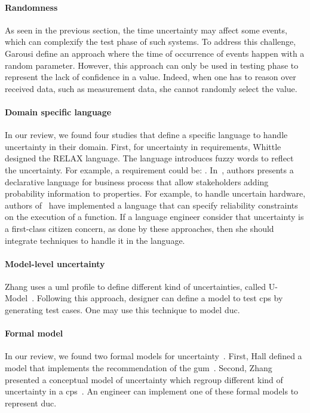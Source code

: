 \paragraph{Randomness}
As seen in the previous section, the time uncertainty may affect some events, which can complexify the test phase of such systems.
To address this challenge, Garousi \etal \cite{DBLP:conf/icst/Garousi08} define an approach where the time of occurrence of events happen with a random parameter.
However, this approach can only be used in testing phase to represent the lack of confidence in a value.
Indeed, when one has to reason over received data, such as measurement data, she cannot randomly select the value.
	
\paragraph{Domain specific language}
In our review, we found four studies that define a specific language to handle uncertainty in their domain.
First, for uncertainty in requirements, Whittle \etal \cite{DBLP:journals/re/WhittleSBCB10, DBLP:conf/re/WhittleSBCB09} designed the RELAX language.
The language introduces fuzzy words to reflect the uncertainty.
For example, a requirement could be: .
In~\cite{DBLP:journals/infsof/Jimenez-RamirezW0V15}, authors presents a declarative language for business process that allow stakeholders adding probability information to properties.
For example, to handle uncertain hardware, authors of~\cite{DBLP:conf/oopsla/CarbinMR13} have implemented a language that can specify reliability constraints on the execution of a function.
If a language engineer consider that uncertainty is a first-class citizen concern, as done by these approaches, then she should integrate techniques to handle it in the language.
	
\paragraph{Model-level uncertainty}
Zhang \etal \cite{DBLP:journals/sosym/Zhang00NO19} uses a \gls{uml} profile to define different kind of uncertainties, called U-Model~\cite{DBLP:conf/ecmdafa/ZhangSAYON16}.
Following this approach, designer can define a model to test \gls{cps} by generating test cases.
One may use this technique to model \gls{duc}.
	
\paragraph{Formal model}
In our review, we found two formal models for uncertainty~\cite{DBLP:journals/csi/Hall06, DBLP:conf/ecmdafa/ZhangSAYON16}.
First, Hall \etal defined a model that implements the recommendation of the \gls{gum}~\cite{DBLP:journals/csi/Hall06}. 
Second, Zhang \etal presented a conceptual model of uncertainty which regroup different kind of uncertainty in a \gls{cps}~\cite{DBLP:conf/ecmdafa/ZhangSAYON16}.
An engineer can implement one of these formal models to represent \gls{duc}.
	
